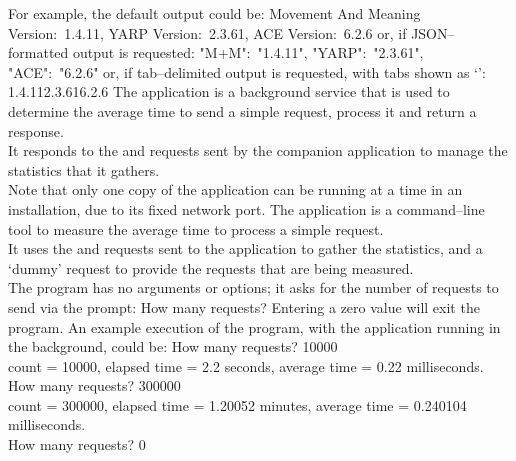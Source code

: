 For example, the default output could be:
\outputBegin{}
Movement And Meaning Version:\ 1.4.11, YARP Version:\ 2.3.61, ACE Version:\ 6.2.6
\outputEnd{}
or, if JSON--formatted output is requested:
\outputBegin{}
\textbraceleft{} "M+M":\ "1.4.11", "YARP":\ "2.3.61", "ACE":\ "6.2.6" \textbraceright
\outputEnd{}
or, if tab--delimited output is requested, with tabs shown as
`\texttt{\boldmath{$\vdash$}}':
\outputBegin{}
1.4.11\pseudotab{}2.3.61\pseudotab{}6.2.6
\outputEnd{}
\secondaryEnd{}
\newpage
{}
The  application is a background service that is
used to determine the average time to send a simple request, process it and return a
response.\\

It responds to the  and
 requests sent by the
companion application  to manage the statistics
that it gathers.\\

Note that only one copy of the  application can be
running at a time in an \mplusm{} installation, due to its fixed \yarp{} network port.
The  application is a command--line tool to
measure the average time to process a simple request.\\

It uses the  and
 requests sent to the
 application to gather the statistics, and a
`dummy' request to provide the requests that are being measured.\\

The program has no arguments or options; it asks for the number of requests to send via
the prompt:
\outputBegin{}
How many requests?
\outputEnd{}
Entering a zero value will exit the program.
An example execution of the program, with the 
application running in the background, could be:
\outputBegin{}
How many requests? 10000\\
count = 10000, elapsed time = 2.2 seconds, average time = 0.22 milliseconds.\\
How many requests? 300000\\
count = 300000, elapsed time = 1.20052 minutes, average time = 0.240104 milliseconds.\\
How many requests? 0\\
\outputEnd{}
\secondaryEnd{}
\primaryEnd{}
